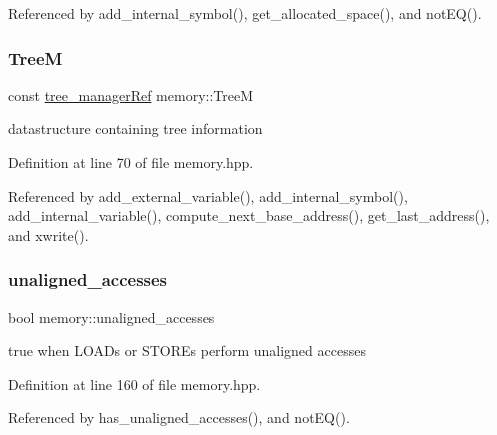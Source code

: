 Referenced by add\+\_\+internal\+\_\+symbol(), get\+\_\+allocated\+\_\+space(), and not\+E\+Q().

\mbox{\label{classmemory_a6806f41edbd2ce52a84c3ba452d011f3}} 
\subsubsection{\texorpdfstring{TreeM}{TreeM}}
{\footnotesize\ttfamily const \hyperlink{tree__manager_8hpp_a96ff150c071ce11a9a7a1e40590f205e}{tree\+\_\+manager\+Ref} memory\+::\+TreeM\hspace{0.3cm}{\ttfamily [private]}}



datastructure containing tree information 



Definition at line 70 of file memory.\+hpp.



Referenced by add\+\_\+external\+\_\+variable(), add\+\_\+internal\+\_\+symbol(), add\+\_\+internal\+\_\+variable(), compute\+\_\+next\+\_\+base\+\_\+address(), get\+\_\+last\+\_\+address(), and xwrite().

\mbox{\label{classmemory_a501c57d0c361729baebefcf365fc3241}} 
\subsubsection{\texorpdfstring{unaligned\+\_\+accesses}{unaligned\_accesses}}
{\footnotesize\ttfamily bool memory\+::unaligned\+\_\+accesses\hspace{0.3cm}{\ttfamily [private]}}



true when L\+O\+A\+Ds or S\+T\+O\+R\+Es perform unaligned accesses 



Definition at line 160 of file memory.\+hpp.



Referenced by has\+\_\+unaligned\+\_\+accesses(), and not\+E\+Q().

\mbox{\label{classmemory_a0b0d3f30b23b5bbb388097f3c117d29e}} 
